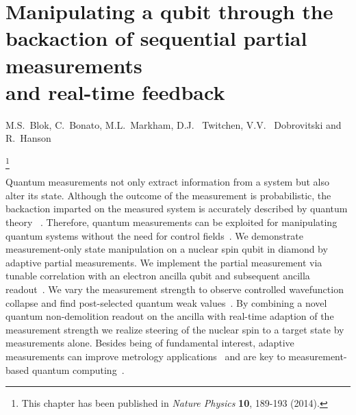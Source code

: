 \graphicspath{{./ch_adptv_msmnt_cntrl/figures/}}


\chapter{Manipulating a qubit through the backaction of sequential partial measurements \\ and real-time feedback }
\label{ch:AMC}

\begin{center} 
    \vspace{-1cm} {M.S.~Blok, C.~Bonato, M.L.~Markham, D.J. ~Twitchen, V.V. ~Dobrovitski and R.~Hanson} 
\end{center}


{\renewcommand{\thefootnote}{}\footnote{This chapter has been published in
    {\em Nature Physics} \textbf{10}, 189-193 (2014).}}


\vspace{-0.5cm} 
Quantum measurements not only extract information from a system but also alter its state. Although the outcome of the measurement is probabilistic, the backaction imparted on the measured system is accurately described by quantum theory ~\cite{Guerlin_Nature_2007,Hatridge_Science_2013,Murch_Nature_2013}. Therefore, quantum measurements can be exploited for manipulating quantum systems without the need for control fields~\cite{Ashhab_PhysRevA_2010,Wiseman_NatureNV_2011}. We demonstrate measurement-only state manipulation on a nuclear spin qubit in diamond by adaptive partial measurements. We implement the partial measurement via tunable correlation with an electron ancilla qubit and subsequent ancilla readout~\cite{Brun_PhysRevA_2008,Groen_PRL_2013}. We vary the measurement strength to observe controlled wavefunction collapse and find post-selected quantum weak values~\cite{Brun_PhysRevA_2008,Groen_PRL_2013,Aharonov_PRL_1988,Pryde_PRL_2005,Dressel_ArXiv_2013}. By combining a novel quantum non-demolition readout on the ancilla with real-time adaption of the measurement strength we realize steering of the nuclear spin to a target state by measurements alone. Besides being of fundamental interest, adaptive measurements can improve metrology applications~\cite{Cappellaro_PhysRevA_2012,Higgins_Nature_2007} and are key to measurement-based quantum computing~\cite{Raussendorf_PRL_2001,Prevedel_Nature_2007}.


\clearpage

